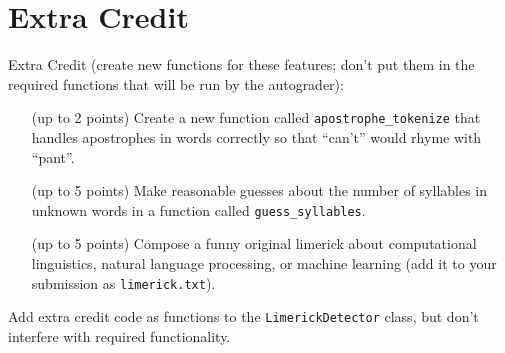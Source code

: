 \documentclass[11pt]{article}
\begin{document}
\section*{Extra Credit}

Extra Credit (create new functions for these features; don’t put them
in the required functions that will be run by the autograder):
\begin{itemize}
\item[(up to 2 points)] Create a new function called
  \texttt{apostrophe\_tokenize} that handles apostrophes in words correctly so
  that ``can’t'' would rhyme with ``pant''.
\item[(up to 5 points)] Make reasonable guesses about the number of syllables in unknown words in a function called \texttt{guess\_syllables}.
\item[(up to 5 points)] Compose a funny original limerick about
  computational linguistics, natural language processing, or machine
  learning (add it to your submission as \texttt{limerick.txt}).
\end{itemize}
Add extra credit code as functions to the \texttt{LimerickDetector}
class, but don't interfere with required functionality.
\end{document}

